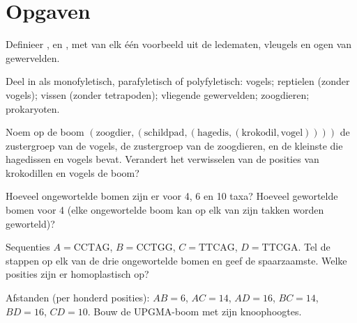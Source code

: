 \section{Opgaven}

\begin{exercise}[$\star$]\label{exo:b2:phylogenetic-trees:1}
Definieer ,  en , met van elk één voorbeeld
uit de ledematen, vleugels en ogen van gewervelden.
\end{exercise}

\begin{exercise}[$\star$]\label{exo:b2:phylogenetic-trees:2}
Deel in als monofyletisch, parafyletisch of polyfyletisch: vogels;
reptielen (zonder vogels); vissen (zonder tetrapoden); vliegende
gewervelden; zoogdieren; prokaryoten.
\end{exercise}

\begin{exercise}[$\star$]\label{exo:b2:phylogenetic-trees:3}
Noem op de boom $(\text{zoogdier},(\text{schildpad},(\text{hagedis},
(\text{krokodil},\text{vogel}))))$ de zustergroep van de
vogels, de zustergroep van de zoogdieren, en de kleinste  die
hagedissen en vogels bevat. Verandert het verwisselen van de posities van
krokodillen en vogels de boom?
\end{exercise}

\begin{exercise}[$\star$]\label{exo:b2:phylogenetic-trees:4}
Hoeveel ongewortelde bomen zijn er voor 4, 6 en 10 taxa? Hoeveel
gewortelde bomen voor 4 (elke ongewortelde boom kan op elk van zijn
takken worden geworteld)?
\end{exercise}

\begin{exercise}[$\star\star$]\label{exo:b2:phylogenetic-trees:5}
Sequenties $A = \mathrm{CCTAG}$, $B = \mathrm{CCTGG}$, $C =
\mathrm{TTCAG}$, $D = \mathrm{TTCGA}$. Tel de stappen op elk van de
drie ongewortelde bomen en geef de spaarzaamste. Welke
posities zijn er homoplastisch op?
\end{exercise}

\begin{exercise}[$\star\star$]\label{exo:b2:phylogenetic-trees:6}
Afstanden (per honderd posities): $AB = 6$, $AC = 14$, $AD = 16$,
$BC = 14$, $BD = 16$, $CD = 10$. Bouw de UPGMA-boom met zijn
knoophoogtes.
\end{exercise}

